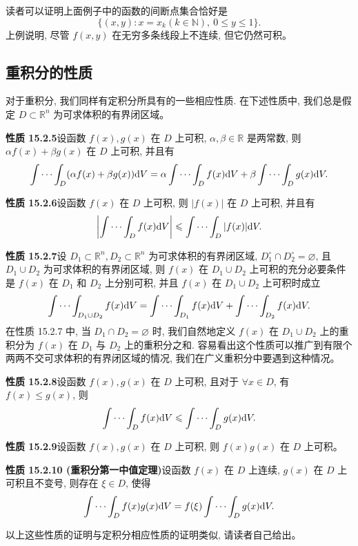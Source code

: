 \documentclass[UTF8,12pt,a4paper,fontset=fandol]{ctexart}
\begin{document}
读者可以证明上面例子中的函数的间断点集合恰好是
\[
  \{(x,y):x=x_k(k\in\mathbb N),\ 0\leqslant y\leqslant1\}.
\]
上例说明, 尽管 $f(x,y)$ 在无穷多条线段上不连续, 但它仍然可积。

\subsection{重积分的性质}

对于重积分, 我们同样有定积分所具有的一些相应性质. 在下述性质中, 我们总是假定 $D\subset\mathbb R^n$ 为可求体积的有界闭区域。

\noindent\textbf{性质 15.2.5}\quad 设函数 $f(x),g(x)$ 在 $D$ 上可积, $\alpha,\beta\in\mathbb R$ 是两常数, 则 $\alpha f(x)+\beta g(x)$ 在 $D$ 上可积, 并且有
\[
  \idotsint_D(\alpha f(x)+\beta g(x))\mathrm dV
  =\alpha\idotsint_D f(x)\mathrm dV+\beta\idotsint_D g(x)\mathrm dV.
\]

\noindent\textbf{性质 15.2.6}\quad 设函数 $f(x)$ 在 $D$ 上可积, 则 $|f(x)|$ 在 $D$ 上可积, 并且有
\[
  \left|\idotsint_D f(x)\mathrm dV\right|
  \leqslant \idotsint_D |f(x)|\mathrm dV.
\]

\noindent\textbf{性质 15.2.7}\quad 设 $D_1\subset\mathbb R^n,D_2\subset\mathbb R^n$ 为可求体积的有界闭区域, $D_1^\circ\cap D_2^\circ=\varnothing$, 且 $D_1\cup D_2$ 为可求体积的有界闭区域, 则 $f(x)$ 在 $D_1\cup D_2$ 上可积的充分必要条件是 $f(x)$ 在 $D_1$ 和 $D_2$ 上分别可积, 并且 $f(x)$ 在 $D_1\cup D_2$ 上可积时成立
\[
  \idotsint_{D_1\cup D_2}f(x)\mathrm dV
  =\idotsint_{D_1}f(x)\mathrm dV+\idotsint_{D_2}f(x)\mathrm dV.
\]
在性质 15.2.7 中, 当 $D_1\cap D_2=\varnothing$ 时, 我们自然地定义 $f(x)$ 在 $D_1\cup D_2$ 上的重积分为 $f(x)$ 在 $D_1$ 与 $D_2$ 上的重积分之和. 容易看出这个性质可以推广到有限个两两不交可求体积的有界闭区域的情况, 我们在广义重积分中要遇到这种情况。

\noindent\textbf{性质 15.2.8}\quad 设函数 $f(x),g(x)$ 在 $D$ 上可积, 且对于 $\forall x\in D$, 有 $f(x)\leqslant g(x)$, 则
\[
  \idotsint_D f(x)\mathrm dV\leqslant\idotsint_D g(x)\mathrm dV.
\]

\noindent\textbf{性质 15.2.9}\quad 设函数 $f(x),g(x)$ 在 $D$ 上可积, 则 $f(x)g(x)$ 在 $D$ 上可积。

\noindent\textbf{性质 15.2.10 (重积分第一中值定理)}\quad 设函数 $f(x)$ 在 $D$ 上连续, $g(x)$ 在 $D$ 上可积且不变号, 则存在 $\xi\in D$, 使得
\[
  \idotsint_D f(x)g(x)\mathrm dV=f(\xi)\idotsint_D g(x)\mathrm dV.
\]

以上这些性质的证明与定积分相应性质的证明类似, 请读者自己给出。
\end{document}
